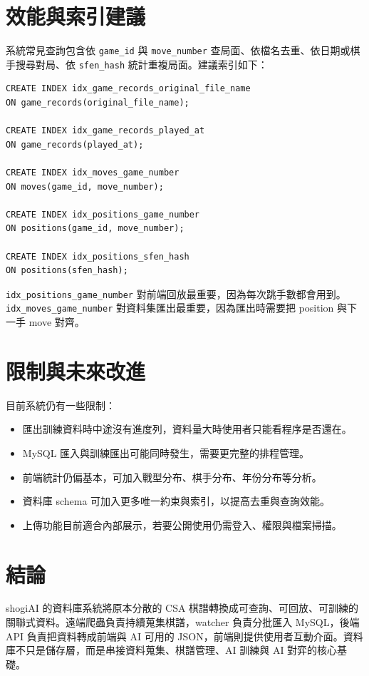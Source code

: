 \documentclass[12pt,a4paper,fontset=none]{ctexart}
\begin{document}
\section{效能與索引建議}

系統常見查詢包含依 \texttt{game\_id} 與 \texttt{move\_number} 查局面、依檔名去重、依日期或棋手搜尋對局、依 \texttt{sfen\_hash} 統計重複局面。建議索引如下：

\begin{lstlisting}[style=cmd]
CREATE INDEX idx_game_records_original_file_name
ON game_records(original_file_name);

CREATE INDEX idx_game_records_played_at
ON game_records(played_at);

CREATE INDEX idx_moves_game_number
ON moves(game_id, move_number);

CREATE INDEX idx_positions_game_number
ON positions(game_id, move_number);

CREATE INDEX idx_positions_sfen_hash
ON positions(sfen_hash);
\end{lstlisting}

\texttt{idx\_positions\_game\_number} 對前端回放最重要，因為每次跳手數都會用到。 \texttt{idx\_moves\_game\_number} 對資料集匯出最重要，因為匯出時需要把 position 與下一手 move 對齊。

\section{限制與未來改進}

目前系統仍有一些限制：

\begin{itemize}
  \item 匯出訓練資料時中途沒有進度列，資料量大時使用者只能看程序是否還在。
  \item MySQL 匯入與訓練匯出可能同時發生，需要更完整的排程管理。
  \item 前端統計仍偏基本，可加入戰型分布、棋手分布、年份分布等分析。
  \item 資料庫 schema 可加入更多唯一約束與索引，以提高去重與查詢效能。
  \item 上傳功能目前適合內部展示，若要公開使用仍需登入、權限與檔案掃描。
\end{itemize}

\section{結論}

shogiAI 的資料庫系統將原本分散的 CSA 棋譜轉換成可查詢、可回放、可訓練的關聯式資料。遠端爬蟲負責持續蒐集棋譜，watcher 負責分批匯入 MySQL，後端 API 負責把資料轉成前端與 AI 可用的 JSON，前端則提供使用者互動介面。資料庫不只是儲存層，而是串接資料蒐集、棋譜管理、AI 訓練與 AI 對弈的核心基礎。
\end{document}
